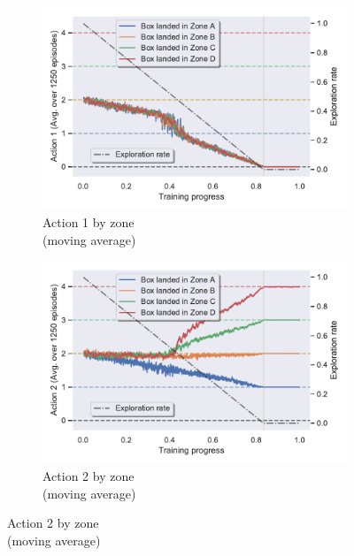\documentclass[11pt,a4paper,twoside]{report}
\newcommand{\+}{\textnormal{+} }
\theoremstyle{definition}
\numberwithin{equation}{chapter}
\begin{document}
\begin{figure}[H]  %
  \begin{subfigure}{0.45\textwidth}
  \includegraphics[width=\linewidth]{figures/Actions1-TSS.pdf}
  \caption{Action 1 by zone \\ (moving average)}
  \label{Actions1-TSS}
  \end{subfigure}
  \hfill %
  \begin{subfigure}{0.45\textwidth}
  \includegraphics[width=\linewidth]{figures/Actions2-TSS.pdf}
  \caption{Action 2 by zone \\ (moving average)}
  \label{Actions2-TSS}
  \end{subfigure}
  

\end{figure}
\end{document}
